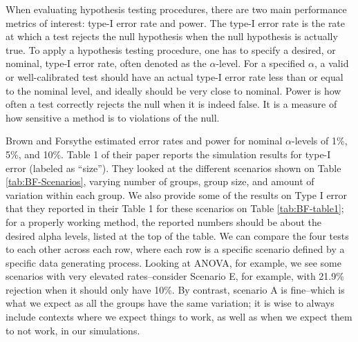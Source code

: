 \documentclass[
]{book}
\begin{document}
When evaluating hypothesis testing procedures, there are two main performance metrics of interest: type-I error rate and power.
The type-I error rate is the rate at which a test rejects the null hypothesis when the null hypothesis is actually true.
To apply a hypothesis testing procedure, one has to specify a desired, or nominal, type-I error rate, often denoted as the \(\alpha\)-level.
For a specified \(\alpha\), a valid or well-calibrated test should have an actual type-I error rate less than or equal to the nominal level, and ideally should be very close to nominal.
Power is how often a test correctly rejects the null when it is indeed false.
It is a measure of how sensitive a method is to violations of the null.

Brown and Forsythe estimated error rates and power for nominal \(\alpha\)-levels of 1\%, 5\%, and 10\%.
Table 1 of their paper reports the simulation results for type-I error (labeled as ``size'').
They looked at the different scenarios shown on Table \ref{tab:BF-Scenarios}, varying number of groups, group size, and amount of variation within each group.
We also provide some of the results on Type I error that they reported in their Table 1 for these scenarios on Table \ref{tab:BF-table1}; for a properly working method, the reported numbers should be about the desired alpha levels, listed at the top of the table.
We can compare the four tests to each other across each row, where each row is a specific scenario defined by a specific data generating process.
Looking at ANOVA, for example, we see some scenarios with very elevated rates--consider Scenario E, for example, with 21.9\% rejection when it should only have 10\%.
By contrast, scenario A is fine--which is what we expect as all the groups have the same variation; it is wise to always include contexts where we expect things to work, as well as when we expect them to not work, in our simulations.
\end{document}

